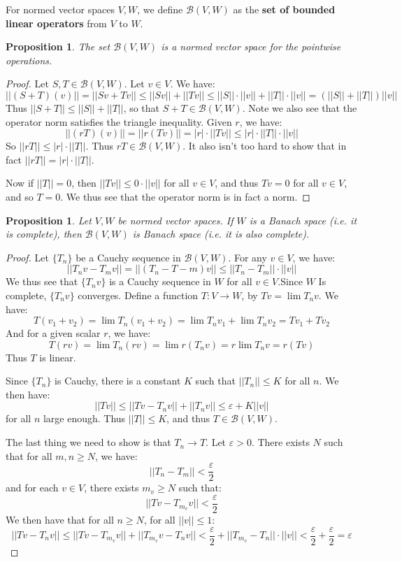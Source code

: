 \documentclass[a4paper,12pt]{report}
\newcommand{\ms}[1]{\mathscr{#1}}
\newcommand{\varep}{ \varepsilon }
\newtheorem{prop}[theorem]{Proposition}
\newenvironment{definition}[1][Definition.]{\begin{trivlist}
\item[\hskip \labelsep {\bfseries #1}]}{\end{trivlist}}
\begin{document}
	\begin{definition}
	For normed vector spaces $V, W$, we define $\ms{B}(V, W)$ as the \textbf{set of bounded linear operators} from $V$ to $W$.
	\end{definition}
	
	\begin{prop}
	The set $\ms{B}(V, W)$ is a normed vector space for the pointwise operations. 
	\end{prop}
	\begin{proof}
	Let $S, T \in \ms{B}(V, W)$. Let $v \in V$. We have:
	\[ ||(S + T)(v)|| = ||Sv + Tv|| \leq ||Sv|| + ||Tv|| \leq ||S|| \cdot ||v|| + ||T|| \cdot ||v|| = (||S|| + ||T||)||v|| \]
	Thus $||S + T|| \leq ||S|| + ||T||$, so that $S + T \in \ms{B}(V, W)$. Note we also see that the operator norm satisfies the triangle inequality. Given $r$, we have:
	\[ ||(rT)(v)|| = ||r(Tv)|| = |r|\cdot||Tv|| \leq |r| \cdot ||T|| \cdot ||v|| \]
	So $||rT|| \leq |r| \cdot ||T||$. Thus $rT \in \ms{B}(V, W)$. It also isn't too hard to show that in fact $||rT|| = |r| \cdot ||T||$. 
	
	Now if $||T|| = 0$, then $||Tv|| \leq 0 \cdot ||v||$ for all $v \in V$, and thus $Tv = 0$ for all $v \in V$, and so $T = 0$. We thus see that the operator norm is in fact a norm. 
	\end{proof}
	
	\begin{prop}
	Let $V, W$ be normed vector spaces. If $W$ is a Banach space (i.e. it is complete), then $\ms{B}(V, W)$ is Banach space (i.e. it is also complete).
	\end{prop}
	\begin{proof}
	Let $\{T_n\}$ be a Cauchy sequence in $\ms{B}(V, W)$. For any $v \in V$, we have:
	\[ ||T_nv - T_mv|| = ||(T_n - T-m)v|| \leq ||T_n - T_m|| \cdot ||v|| \]
	We thus see that $\{T_n v\}$ is a Cauchy sequence in $W$ for all $v \in V$.Since $W$ Is complete, $\{T_n v\}$ converges. Define a function $T : V \rightarrow W$, by $Tv = \lim T_n v$. We have:
	\[ T(v_1 + v_2) = \lim T_n(v_1 + v_2) = \lim T_nv_1 + \lim T_nv_2 = Tv_1 + Tv_2 \]
	And for a given scalar $r$, we have:
	\[ T(rv) = \lim T_n(rv) = \lim r(T_nv) = r \lim T_nv = r(Tv) \]
	Thus $T$ is linear.
	
	Since $\{T_n\}$ is Cauchy, there is a constant $K$ such that $||T_n|| \leq K$ for all $n$. We then have:
	\[ ||Tv|| \leq ||Tv - T_nv|| + ||T_nv|| \leq \varep + K||v|| \]
	for all $n$ large enough. Thus $||T|| \leq K$, and thus $T \in \ms{B}(V, W)$. 
	
	The last thing we need to show is that $T_n \rightarrow T$. Let $\varep > 0$. There exists $N$ such that for all $m, n \geq N$, we have:
	\[ ||T_n - T_m|| < \frac{\varep}{2} \]
	and for each $v \in V$, there exists $m_v \geq N$ such that:
	\[ ||Tv - T_{m_v}v|| < \frac{\varep}{2} \]
	We then have that for all $n \geq N$, for all $||v|| \leq 1$:
	\[ ||Tv - T_n v|| \leq ||Tv - T_{m_v}v|| + ||T_{m_v}v - T_nv|| < \frac{\varep}{2} + ||T_{m_v} - T_n|| \cdot ||v|| < \frac{\varep}{2} + \frac{\varep}{2} = \varep \]
	\end{proof}
	
\end{document}
